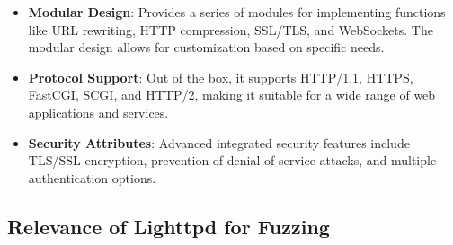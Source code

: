 \begin{itemize}
    \item \textbf{Modular Design}: Provides a series of modules for implementing functions like URL rewriting, HTTP compression, SSL/TLS, and WebSockets. The modular design allows for customization based on specific needs.
    
    \item \textbf{Protocol Support}: Out of the box, it supports HTTP/1.1, HTTPS, FastCGI, SCGI, and HTTP/2, making it suitable for a wide range of web applications and services.
    
    \item \textbf{Security Attributes}: Advanced integrated security features include TLS/SSL encryption, prevention of denial-of-service attacks, and multiple authentication options.
\end{itemize}

\subsection{Relevance of Lighttpd for Fuzzing}

